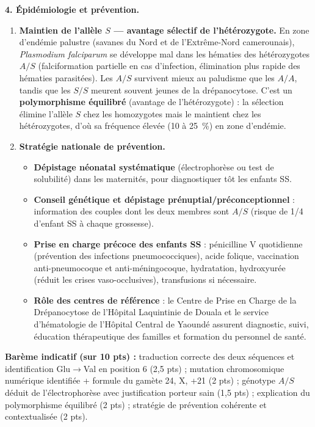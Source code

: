 \documentclass[11pt]{article}
\begin{document}
\begin{corrige}
\textbf{4. Épidémiologie et prévention.}

\begin{enumerate}
    \item \textbf{Maintien de l'allèle $S$ — avantage sélectif de l'hétérozygote.} En zone d'endémie palustre (savanes du Nord et de l'Extrême-Nord camerounais), \emph{Plasmodium falciparum} se développe mal dans les hématies des hétérozygotes $A/S$ (falciformation partielle en cas d'infection, élimination plus rapide des hématies parasitées). Les $A/S$ survivent mieux au paludisme que les $A/A$, tandis que les $S/S$ meurent souvent jeunes de la drépanocytose. C'est un \textbf{polymorphisme équilibré} (avantage de l'hétérozygote) : la sélection élimine l'allèle $S$ chez les homozygotes mais le maintient chez les hétérozygotes, d'où sa fréquence élevée (10 à \SI{25}{\percent}) en zone d'endémie.
    \item \textbf{Stratégie nationale de prévention.}
    \begin{itemize}
        \item \textbf{Dépistage néonatal systématique} (électrophorèse ou test de solubilité) dans les maternités, pour diagnostiquer tôt les enfants SS.
        \item \textbf{Conseil génétique et dépistage prénuptial/préconceptionnel} : information des couples dont les deux membres sont $A/S$ (risque de 1/4 d'enfant SS à chaque grossesse).
        \item \textbf{Prise en charge précoce des enfants SS} : pénicilline V quotidienne (prévention des infections pneumococciques), acide folique, vaccination anti-pneumocoque et anti-méningocoque, hydratation, hydroxyurée (réduit les crises vaso-occlusives), transfusions si nécessaire.
        \item \textbf{Rôle des centres de référence} : le Centre de Prise en Charge de la Drépanocytose de l'Hôpital Laquintinie de Douala et le service d'hématologie de l'Hôpital Central de Yaoundé assurent diagnostic, suivi, éducation thérapeutique des familles et formation du personnel de santé.
    \end{itemize}
\end{enumerate}

\textbf{Barème indicatif (sur 10 pts) :} traduction correcte des deux séquences et identification Glu$\rightarrow$Val en position 6 (2,5 pts) ; mutation chromosomique numérique identifiée + formule du gamète 24, X, +21 (2 pts) ; génotype $A/S$ déduit de l'électrophorèse avec justification porteur sain (1,5 pts) ; explication du polymorphisme équilibré (2 pts) ; stratégie de prévention cohérente et contextualisée (2 pts).


\end{corrige}
\end{document}
